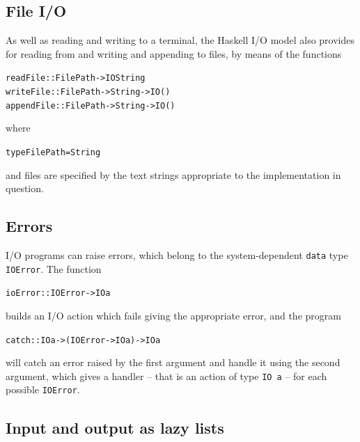 \subsection*{File I/O}
As well as reading and writing to a terminal, the Haskell I/O model also provides for reading from and
writing and appending to files, by means of the functions
\begin{alltt}
readFile   :: FilePath -> IO String
writeFile  :: FilePath -> String -> IO ()
appendFile :: FilePath -> String -> IO ()
\end{alltt} 
where
\begin{alltt}
type FilePath = String
\end{alltt}                                                                               
and files are specified by the text strings appropriate to the
implementation in question.

\subsection*{Errors}

I/O programs can raise errors, which belong to the system-dependent
\texttt{data} type \texttt{IOError}. The function
\begin{alltt}
ioError :: IOError -> IO a
\end{alltt}
builds an I/O action which fails giving the appropriate error, and the program
\begin{alltt}
catch :: IO a -> (IOError -> IO a) -> IO a
\end{alltt}
will catch an error raised by the first argument and
handle it using the second argument, which gives a handler -- that is an
action of type \texttt{IO a} -- for each possible \texttt{IOError}.

\subsection*{Input and output as lazy lists}

